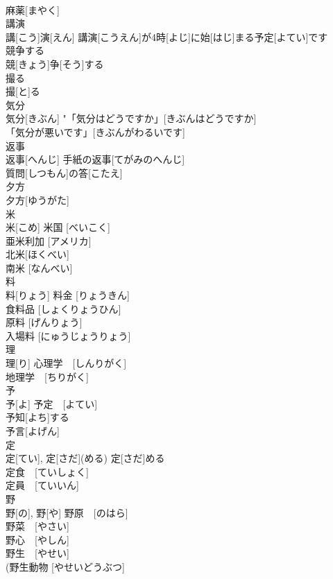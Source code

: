 \documentclass[8pt]{extreport}
\begin{document}
\begin{CJK}{UTF8}{min}
\\	麻薬[まやく] 
\\	講演	
\\	講[こう]演[えん]	講演[こうえん]が4時[よじ]に始[はじ]まる予定[よてい]です 
\\	競争する	
\\	競[きょう]争[そう]する	
\\	撮る	
\\	撮[と]る	
\\	気分	
\\	気分[きぶん]	"「気分はどうですか」[きぶんはどうですか] 
\\	「気分が悪いです」[きぶんがわるいです] 
\\	返事	
\\	返事[へんじ]	手紙の返事[てがみのへんじ] 
\\	質問[しつもん]の答[こたえ] 
\\	夕方	
\\	夕方[ゆうがた]	
\\	米	
\\	米[こめ]	米国 [べいこく] 
\\	亜米利加 [アメリカ] 
\\	北米[ほくべい] 
\\	南米 [なんべい] 
\\	料	
\\	料[りょう]	料金 [りょうきん]　
\\	食料品 [しょくりょうひん] 
\\	原料 [げんりょう]　
\\	入場料 [にゅうじょうりょう]　
\\	理	
\\	理[り]	心理学　[しんりがく] 
\\	地理学　[ちりがく]　
\\	予	
\\	予[よ]	予定　[よてい] 
\\	予知[よち]する　
\\	予言[よげん] 
\\	定	
\\	定[てい], 定[さだ](める)	定[さだ]める　 
\\	定食　[ていしょく] 
\\	定員　[ていいん]　
\\	野	
\\	野[の], 野[や]	野原　[のはら]　
\\	野菜　[やさい] 
\\	野心　[やしん] 
\\	野生　[やせい] 
\\	(野生動物 [やせいどうぶつ] 

\end{CJK}
\end{document}
